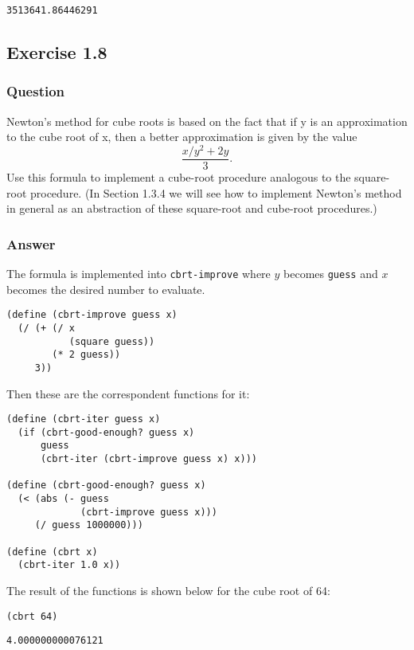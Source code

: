 \documentclass[11pt]{article}
\begin{document}
\begin{verbatim}
3513641.86446291
\end{verbatim}

\subsection{Exercise 1.8}
\label{sec:orgb897e9f}
\subsubsection{Question}
\label{sec:org57846d0}
Newton’s method for cube roots is based on
the fact that if y is an approximation to the cube root of x,
then a better approximation is given by the value
$$
\frac{x/y^2 + 2y}{3}.
$$
Use this formula to implement a cube-root procedure analogous
to the square-root procedure. (In Section 1.3.4 we will
see how to implement Newton’s method in general as an
abstraction of these square-root and cube-root procedures.)

\subsubsection{Answer}
\label{sec:orga563086}
The formula is implemented into \texttt{cbrt-improve} where \(y\) becomes \texttt{guess} and \(x\) becomes the desired number to evaluate.
\begin{verbatim}
(define (cbrt-improve guess x)
  (/ (+ (/ x
           (square guess))
        (* 2 guess))
     3))
\end{verbatim}
Then these are the correspondent functions for it:
\begin{verbatim}
(define (cbrt-iter guess x)
  (if (cbrt-good-enough? guess x)
      guess
      (cbrt-iter (cbrt-improve guess x) x)))

(define (cbrt-good-enough? guess x)
  (< (abs (- guess
             (cbrt-improve guess x)))
     (/ guess 1000000)))

(define (cbrt x)
  (cbrt-iter 1.0 x))
\end{verbatim}
The result of the functions is shown below for the cube root of 64:
\begin{verbatim}
(cbrt 64)
\end{verbatim}

\begin{verbatim}
4.000000000076121
\end{verbatim}
\end{document}
